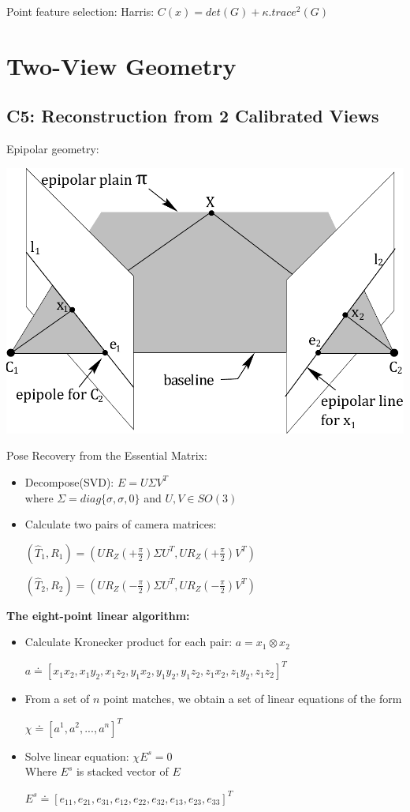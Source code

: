 \documentclass{../cheat}
\begin{document}
\begin{multicols}{3}
	Point feature selection:	Harris: $C(x)=det(G)+\kappa.trace^2(G)$

\section{Two-View Geometry}

\subsection{C5: Reconstruction from 2 Calibrated Views}
	Epipolar geometry:\\
	\centerline{\includegraphics[scale=0.3]{images/epipolar_fig_9_1}}
	
	Pose Recovery from the Essential Matrix:
	\begin{itemize}[nolistsep, leftmargin=1em]
		\item Decompose(SVD): $E=U\Sigma V^T$\\
			where $\Sigma=diag\{\sigma,\sigma,0\}$ and $U,V \in SO(3)$
		\item Calculate two pairs of camera matrices:\\
			\centerline{$(\widehat{T}_1,R_1)=(UR_Z(+\frac{\pi}{2})\Sigma U^T, UR_Z(+\frac{\pi}{2})V^T)$}
			\centerline{$(\widehat{T}_2,R_2)=(UR_Z(-\frac{\pi}{2})\Sigma U^T, UR_Z(-\frac{\pi}{2})V^T)$}
	\end{itemize}
	
	\textbf{The eight-point linear algorithm:}
	\begin{itemize}[nolistsep, leftmargin=1em]
		\item Calculate Kronecker product for each pair: $a=x_1\otimes x_2$\\
			\centerline{$a \doteq [x_1 x_2 ,x_1 y_2 ,x_1 z_2 ,y_1 x_2 ,y_1 y_2 ,y_1 z_2 ,z_1 x_2 ,z_1 y_2 ,z_1 z_2]^T$}
		\item From a set of $n$ point matches, we obtain a set of linear equations of the form\\
			\centerline{$\chi\doteq[a^1, a^2, ..., a^n]^T$}
		\item Solve linear equation:  $\chi E^s=0$ \\
			Where $E^s $ is stacked vector of $E$\\
			\centerline{$E^s\doteq[e_{11}, e_{21}, e_{31}, e_{12}, e_{22}, e_{32}, e_{13}, e_{23}, e_{33}]^T$}
	\end{itemize}
	

\end{multicols}
\end{document}
